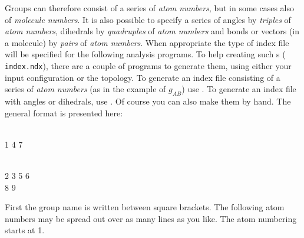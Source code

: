 Groups can therefore consist of a series of {\em atom numbers}, but in
some cases also of {\em molecule numbers}.  It is also possible to
specify a series of angles by {\em triples} of {\em atom numbers},
dihedrals by {\em quadruples} of {\em atom numbers} and bonds or
vectors (in a molecule) by {\em pairs} of {\em atom numbers}. When
appropriate the type of index file will be specified for the following
analysis programs.  To help creating such s ({\tt
index.ndx}), there are a couple of programs to generate them, using
either your input configuration or the topology.  To generate an
index file consisting of a series of {\em atom numbers} (as in the
example of $g_{AB}$) use {\tt {}}. To generate an index file
with angles or dihedrals, use {\tt {}}. Of course you can also
make them by hand. The general format is presented here:

\begin{tt}
[ Oxygen ]\\
   1       4       7 \\
\end{tt}
\begin{tt}
[ Hydrogen ]\\
   2       3       5       6\\
   8       9\\
\end{tt}

First the group name is written between square brackets. The following
atom numbers may be spread out over as many lines as you like. The
atom numbering starts at 1.

